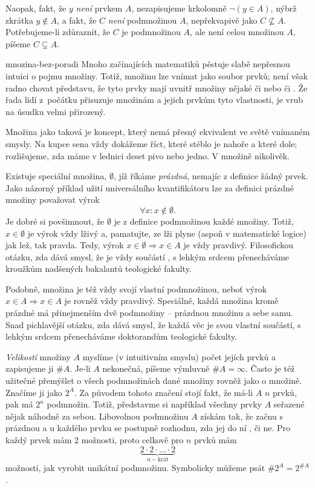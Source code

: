 Naopak, fakt, že $y$ \emph{není} prvkem $A$, nezapisujeme krkolomně $\neg (y \in
A)$, nýbrž zkrátka $y \notin A$, a fakt, že $C$ \emph{není} podmnožinou $A$,
nepřekvapivě jako $C \nsubseteq A$. Potřebujeme-li zdůraznit, že $C$ je
podmnožinou $A$, ale není celou množinou $A$, píšeme $C \subsetneq A$.
\begin{warning}{}{mnozina-bez-poradi}
 Mnoho začínajících matematiků pěstuje slabě nepřesnou intuici o pojmu množiny.
 Totiž, množinu lze vnímat jako soubor prvků; není však radno chovat představu,
 že tyto prvky mají uvnitř množiny nějaké  či  nebo
  či . Že řada lidí z~počátku přisuzuje množinám a
 jejich prvkům tyto vlastnosti, je vrub na úsudku velmi přirozený.

 Množina jako taková je koncept, který nemá přesný ekvivalent ve světě vnímaném
 smysly. Na kupce sena vždy dokážeme říct, které stéblo je nahoře a které dole;
 rozlišujeme, zda máme v lednici deset pivo nebo jedno. V množině nikolivěk.
\end{warning}
Existuje speciální množina, $\emptyset$, jíž říkáme \emph{prázdná}, nemajíc z
definice žádný prvek. Jako názorný příklad užití universálního kvantifikátoru
lze za definici prázdné množiny považovat výrok
\[
 \forall x: x \notin \emptyset.
\]
Je dobré si povšimnout, že $\emptyset$ je z definice podmnožinou každé množiny.
Totiž, $x \in \emptyset$ je výrok vždy lživý a, pamatujte, ze lži plyne (aspoň v
matematické logice) jak lež, tak pravda. Tedy, výrok $x \in \emptyset
\Rightarrow x \in A$ je vždy pravdivý. Filosofickou otázku, zda dává smysl, že
 je vždy součástí , s lehkým srdcem přenecháváme kroužkům
nadšených bakalantů teologické fakulty.

Podobně, množina je též vždy svojí vlastní podmnožinou, neboť výrok $x \in A
\Rightarrow x \in A$ je rovněž vždy pravdivý. Speciálně, každá množina kromě
prázdné má přinejmenším dvě podmnožiny -- prázdnou množinu a sebe samu. Snad
pichlavější otázku, zda dává smysl, že každá věc je svou vlastní součástí, s
lehkým srdcem přenecháváme doktorandům teologické fakulty.

\emph{Velikostí} množiny $A$ myslíme (v intuitivním smyslu) počet jejích prvků a
zapisujeme ji $\# A$. Je-li $A$ nekonečná, píšeme výmluvně $\# A = \infty$.
Často je též užitečné přemýšlet o všech podmnožinách dané množiny rovněž jako o
množině. Značíme ji jako $2^{A}$. Za původem tohoto značení stojí fakt, že má-li
$A$ $n$ prvků, pak má $2^{n}$ podmnožin. Totiž, představme si například všechny
prvky $A$ seřazené nějak náhodně za sebou. Libovolnou podmnožinu $A$ získám tak,
že začnu s prázdnou  a u každého prvku se postupně rozhodnu, zda jej
do ní , či ne. Pro každý prvek mám $2$ možnosti, proto celkově pro $n$
prvků mám
\[
 \underbrace{2 \cdot 2 \cdot \ldots \cdot 2}_{n-\text{krát}}
\]
možností, jak vyrobit unikátní podmnožinu. Symbolicky můžeme psát $\# 2^{A}
= 2^{\# A}$.

